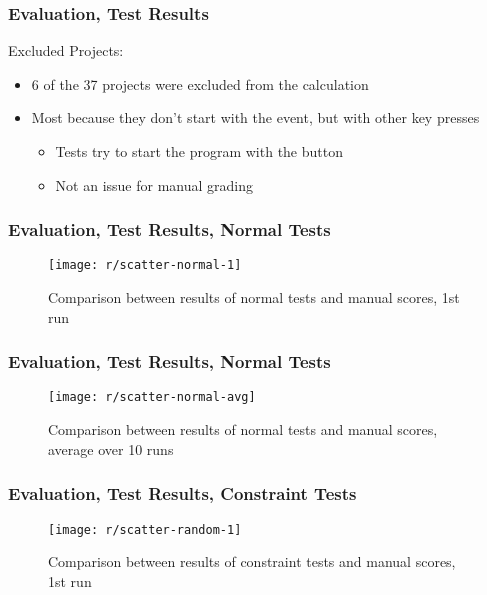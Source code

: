 \begin{frame}\frametitle{Evaluation, Test Results}
    Excluded Projects:
    \begin{itemize}
        \item 6 of the 37 projects were excluded from the calculation
        \item Most because they don't start with the \greenflag event, but with other key presses
            \begin{itemize}
                \item Tests try to start the program with the \greenflag button
                \item Not an issue for manual grading
            \end{itemize}
    \end{itemize}

\end{frame}

\begin{frame}\frametitle{Evaluation, Test Results, Normal Tests}
    \begin{figure}
        \begin{minipage}{.85\textwidth}
            \texttt{[image: r/scatter-normal-1]}
            \caption{Comparison between results of normal tests and manual scores, 1st run}
        \end{minipage}
    \end{figure}
\end{frame}

\begin{frame}\frametitle{Evaluation, Test Results, Normal Tests}
    \begin{figure}
        \begin{minipage}{.85\textwidth}
            \texttt{[image: r/scatter-normal-avg]}
            \caption{Comparison between results of normal tests and manual scores, average over 10 runs}
        \end{minipage}
    \end{figure}
\end{frame}

\begin{frame}\frametitle{Evaluation, Test Results, Constraint Tests}
    \begin{figure}
        \begin{minipage}{.85\textwidth}
            \texttt{[image: r/scatter-random-1]}
            \caption{Comparison between results of constraint tests and manual scores, 1st run}
        \end{minipage}
    \end{figure}
\end{frame}

